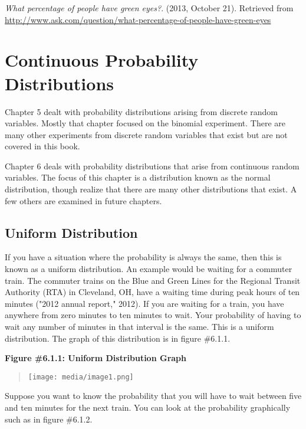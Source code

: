 \documentclass[]{book}
\begin{document}
\emph{What percentage of people have green eyes?}. (2013, October 21).
Retrieved from
\url{http://www.ask.com/question/what-percentage-of-people-have-green-eyes}

\hypertarget{continuous-probability-distributions}{%
\chapter{Continuous Probability Distributions}\label{continuous-probability-distributions}}

Chapter 5 dealt with probability distributions arising from discrete random variables. Mostly that chapter focused on the binomial experiment. There are many other experiments from discrete random variables that exist but are not covered in this book.

Chapter 6 deals with probability distributions that arise from continuous random variables. The focus of this chapter is a distribution known as the normal distribution, though realize that there are many other distributions that exist. A few others are examined in future chapters.

\hypertarget{uniform-distribution}{%
\section{Uniform Distribution}\label{uniform-distribution}}

If you have a situation where the probability is always the same, then this is known as a uniform distribution. An example would be waiting for a commuter train. The commuter trains on the Blue and Green Lines for the Regional Transit Authority (RTA) in Cleveland, OH, have a waiting time during peak hours of ten minutes ("2012 annual report," 2012). If you are waiting for a train, you have anywhere from zero minutes to ten minutes to wait. Your probability of having to wait any number of minutes in that interval is the same. This is a uniform distribution. The graph of this distribution is in figure \#6.1.1.

\textbf{Figure \#6.1.1: Uniform Distribution Graph}

\begin{quote}
\texttt{[image: media/image1.png]}
\end{quote}

Suppose you want to know the probability that you will have to wait between five and ten minutes for the next train. You can look at the probability graphically such as in figure \#6.1.2.
\end{document}

